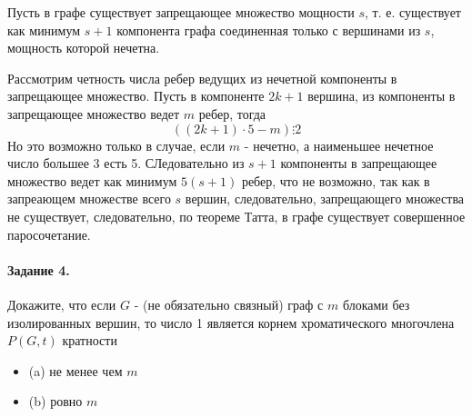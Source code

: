 \documentclass[a4paper,12pt]{article}
\begin{document}
\begin{Solution}
Пусть в графе существует запрещающее множество мощности $s$, т. е. существует как минимум $s+1$ компонента графа соединенная только с вершинами из $s$, мощность которой нечетна.

Рассмотрим четность числа ребер ведущих из нечетной компоненты в запрещающее множество. Пусть в компоненте $2k+1$ вершина, из компоненты в запрещающее множество ведет $m$ ребер, тогда
\[
	\left(\left(2k+1\right)\cdot 5 - m\right) \vdots 2
\]
Но это возможно только в случае, если $m$ - нечетно, а наименьшее нечетное число большее 3 есть 5. СЛедовательно из $s+1$ компоненты в запрещающее множество ведет как минимум $5 \left(s+1\right)$ ребер, что не возможно, так как в запреающем множестве всего $s$ вершин, следовательно, запрещающего множества не существует, следовательно, по теореме Татта, в графе существует совершенное паросочетание.
\end{Solution}

\paragraph{Задание 4.} Докажите, что если $G$ - (не обязательно связный) граф с $m$ блоками без изолированных вершин, то число 1 является корнем хроматического многочлена $P\left(G, t\right)$ кратности
\begin{itemize}
\item (a) не менее чем $m$

\item (b) ровно $m$
\end{itemize}
\end{document}
